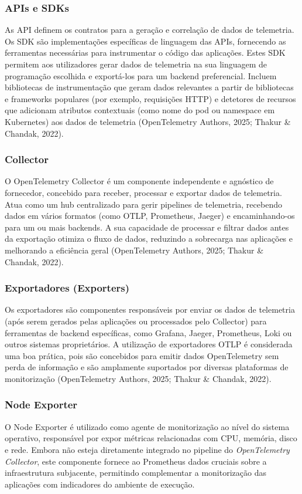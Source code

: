\subsubsection{APIs e SDKs}
As API definem os contratos para a geração e correlação de dados de telemetria. Os SDK são implementações específicas de linguagem das APIs, fornecendo as ferramentas necessárias para instrumentar o código das aplicações. Estes SDK permitem aos utilizadores gerar dados de telemetria na sua linguagem de programação escolhida e exportá-los para um backend preferencial. Incluem bibliotecas de instrumentação que geram dados relevantes a partir de bibliotecas e frameworks populares (por exemplo, requisições HTTP) e detetores de recursos que adicionam atributos contextuais (como nome do pod ou namespace em Kubernetes) aos dados de telemetria (OpenTelemetry Authors, 2025; Thakur \& Chandak, 2022).

\subsubsection{Collector}
O OpenTelemetry Collector é um componente independente e agnóstico de fornecedor, concebido para receber, processar e exportar dados de telemetria. Atua como um hub centralizado para gerir pipelines de telemetria, recebendo dados em vários formatos (como OTLP, Prometheus, Jaeger) e encaminhando-os para um ou mais backends. A sua capacidade de processar e filtrar dados antes da exportação otimiza o fluxo de dados, reduzindo a sobrecarga nas aplicações e melhorando a eficiência geral (OpenTelemetry Authors, 2025; Thakur \& Chandak, 2022).

\subsubsection{Exportadores (Exporters)}
Os exportadores são componentes responsáveis por enviar os dados de telemetria (após serem gerados pelas aplicações ou processados pelo Collector) para ferramentas de backend específicas, como Grafana, Jaeger, Prometheus, Loki ou outros sistemas proprietários. A utilização de exportadores OTLP é considerada uma boa prática, pois são concebidos para emitir dados OpenTelemetry sem perda de informação e são amplamente suportados por diversas plataformas de monitorização (OpenTelemetry Authors, 2025; Thakur \& Chandak, 2022).

\subsubsection{Node Exporter}
O Node Exporter é utilizado como agente de monitorização ao nível do sistema operativo, responsável por expor métricas relacionadas com CPU, memória, disco e rede. Embora não esteja diretamente integrado no pipeline do \textit{OpenTelemetry Collector}, este componente fornece ao Prometheus dados cruciais sobre a infraestrutura subjacente, permitindo complementar a monitorização das aplicações com indicadores do ambiente de execução.

